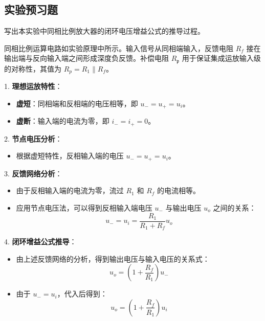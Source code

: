 \documentclass[dvipsnames, svgnames,a4paper,11pt]{article}
\begin{document}
	
	
	\subsection{实验预习题}
	
	\begin{question}
		写出本实验中同相比例放大器的闭环电压增益公式的推导过程。
	\end{question}
	同相比例运算电路如实验原理中所示。输入信号从同相端输入，反馈电阻 \(R_{f}\) 接在输出端与反向输入端之间形成深度负反馈。补偿电阻 \(R_{\mathfrak{p}}\) 用于保证集成运放输入级的对称性，其值为 \(R_p = R_1 \parallel R_f\)。

1. \textbf{理想运放特性}：
    \begin{itemize}
        \item \textbf{虚短}：同相端和反相端的电压相等，即 \( u_{-} = u_{+} = u_{i} \)。
        \item \textbf{虚断}：输入端的电流为零，即 \( i_{-} = i_{+} = 0 \)。
    \end{itemize}

2. \textbf{节点电压分析}：
    \begin{itemize}
        \item 根据虚短特性，反相输入端的电压 \( u_{-} = u_{+} = u_{i} \)。
    \end{itemize}

3. \textbf{反馈网络分析}：
    \begin{itemize}
        \item 由于反相输入端的电流为零，流过 \( R_{1} \) 和 \( R_{f} \) 的电流相等。
        \item 应用节点电压法，可以得到反相输入端电压 \( u_{-} \) 与输出电压 \( u_{o} \) 之间的关系：
        \begin{equation}
        u_{-} = u_{i} = \frac{R_{1}}{R_{1} + R_{f}} u_{o}
        \end{equation}
    \end{itemize}

4. \textbf{闭环增益公式推导}：
    \begin{itemize}
        \item 由上述反馈网络的分析，得到输出电压与输入电压的关系式：
        \begin{equation}
        u_{o} = \left( 1 + \frac{R_{f}}{R_{1}} \right) u_{-}
        \end{equation}
        \item 由于 \( u_{-} = u_{i} \)，代入后得到：
        \begin{equation}
        u_{o} = \left( 1 + \frac{R_{f}}{R_{1}} \right) u_{i}
        \end{equation}
    \end{itemize}
\end{document}
